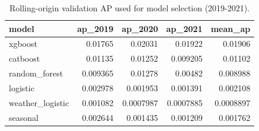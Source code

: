 \begin{table}
\caption{Rolling-origin validation AP used for model selection (2019-2021).}
\label{tab:T4_rolling_validation}
\begin{tabular}{lrrrr}
\toprule
model & ap_2019 & ap_2020 & ap_2021 & mean_ap \\
\midrule
xgboost & 0.01765 & 0.02031 & 0.01922 & 0.01906 \\
catboost & 0.01135 & 0.01252 & 0.009205 & 0.01102 \\
random_forest & 0.009365 & 0.01278 & 0.00482 & 0.008988 \\
logistic & 0.002978 & 0.001953 & 0.001391 & 0.002108 \\
weather_logistic & 0.001082 & 0.0007987 & 0.0007885 & 0.0008897 \\
seasonal & 0.002644 & 0.001435 & 0.001209 & 0.001762 \\
\bottomrule
\end{tabular}
\end{table}
